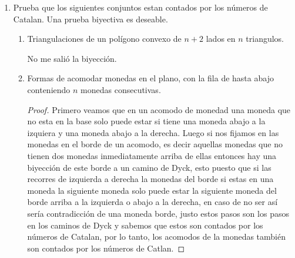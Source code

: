 \documentclass[letterpaper]{article}
\newcommand{\pars}[1]{\left( #1 \right) }
\newcommand{\1}{\mathbbm{1}}
\begin{document}
\begin{enumerate}
\begin{proof}
			\[C(4x^2) = \sum_{i=0}^\infty 4^{i}C_ix^{2i}.\]

			Por fórmula cerrada tenemos que si

			\[\pars{\frac{C(x)+C(-x)}{2}}^2 = C(4x^2)\]

			es si y sólo si

			\[\pars{\frac{\pars{\frac{1-\sqrt{1-4x}}{2x}}+\pars{\frac{1-\sqrt{1-4x}}{2x}}}{2}}^2 = \frac{1-\sqrt{1-16x^2}}{8x^2},\]

			esto es si y sólo si

			\[\pars{\frac{\sqrt{1+4x}-\sqrt{1-4x}}{4x}}^2 = \frac{1-\sqrt{1-16x^2}}{8x^2},\]

			esto es si y sólo si

			\[\frac{2\pars{1-\sqrt{1-16x^2}}}{16x^2} = \frac{1-\sqrt{1-16x^2}}{8x^2},\]

			lo cuál es cierto.

			Ahora por que una serie formal es igual a otro si y sólo si sus coeficientes son iguales entonces conocluimos que

			\[\sum^n_{k=0}C_{2k}C_{2(n- k)} = 4^nC_n\]

		\end{proof}

		\item Prueba que los siguientes conjuntos estan contados por los n\'umeros de Catalan. Una prueba biyectiva es deseable.

		\begin{enumerate}
			\item Triangulaciones de un polígono convexo de $n+2$ lados en $n$ triangulos.
			
			No me salió la biyección.
			
			\item Formas de acomodar monedas en el plano, con la fila de hasta abajo conteniendo $n$ monedas consecutivas.
			
			\begin{proof}
				Primero veamos que en un acomodo de monedad una moneda que no esta en la base solo puede estar si tiene una moneda abajo a la izquiera y una moneda abajo a la derecha. Luego si nos fijamos en las monedas en el borde de un acomodo, es decir aquellas monedas que no tienen dos monedas inmediatamente arriba de ellas entonces hay una biyección de este borde a un camino de Dyck, esto puesto que si las recorres de izquierda a derecha la monedas del borde si estas en una moneda la siguiente moneda solo puede estar la siguiente moneda del borde arriba a la izquierda o abajo a la derecha, en caso de no ser así sería contradicción de una moneda borde, justo estos pasos son los pasos en los caminos de Dyck y sabemos que estos son contados por los números de Catalan, por lo tanto, los acomodos de la monedas también son contados por los números de Catlan.
			\end{proof}
		\end{enumerate}


\end{enumerate}
\end{document}
